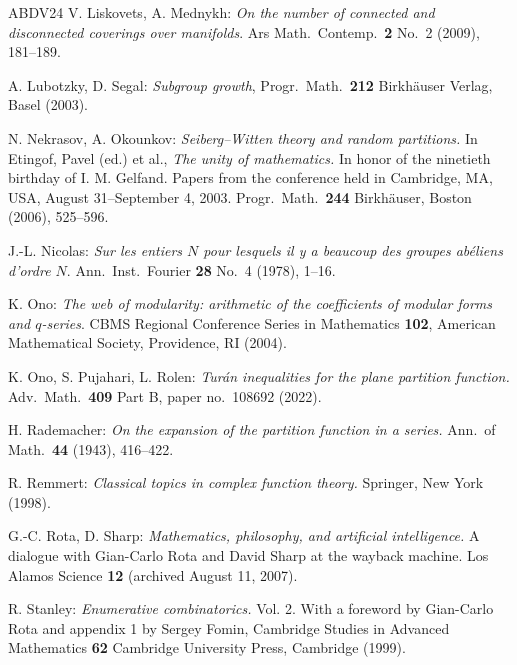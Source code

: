 \documentclass[11pt,reqno]{amsart}
\theoremstyle{plain}
\theoremstyle{remark}
\theoremstyle{definition}
\numberwithin{equation}{section}
\begin{document}
\begin{thebibliography}{ABDV24}
 V. Liskovets,
A. Mednykh:
\emph{On the number of connected and disconnected coverings over manifolds\/}.
Ars Math.\ Contemp.\ \textbf{2}
No.\ 2 (2009), 181--189.



 A. Lubotzky,
D. Segal: {\it Subgroup growth\/},
Progr.\ Math.\ \textbf{212}
Birkh\"{a}user Verlag, Basel
(2003). 






 N. Nekrasov, A. Okounkov: \emph{Seiberg--Witten theory and random partitions.}
In Etingof, Pavel (ed.) et al.,
{\it The unity of mathematics.\/}
In honor of the ninetieth birthday of I. M. Gelfand. Papers from the conference held in Cambridge, MA, USA, August 31--September 4, 2003.
Progr.\ Math.\ {\bf{244}} Birkh\"{a}user,
Boston (2006), 525--596.






  J.-L. Nicolas:
\emph{Sur les entiers \(N\) pour lesquels il y a
beaucoup des groupes ab\'{e}liens d'ordre \(N\)\/}.
Ann.\ Inst.\ Fourier \textbf{28}
No.\ 4 (1978), 1--16.


K. Ono:
\emph{The
web of
modularity:
arithmetic of the
coefficients of
modular
forms
and $q$-series\/}.
CBMS Regional Conference Series in Mathematics \textbf{102},
American Mathematical Society, Providence, RI (2004).

  K. Ono, S. Pujahari, L. Rolen:
\emph{Tur\'{a}n inequalities for the plane partition function.\/}
Adv.\ Math.\ \textbf{409} Part B,
paper no.\ 108692
(2022).

H. Rademacher: \emph{On the expansion of the partition function in a series.\/}
Ann.\ of Math.\ \textbf{44}
(1943), 416--422.


 R. Remmert: \emph{Classical topics in complex function theory.\/}
Springer, New York (1998).

 G.-C. Rota, D. Sharp: \emph{Mathematics,
philosophy, and
artificial
intelligence.\/} A dialogue with Gian-Carlo Rota and David Sharp at the
wayback
machine. Los Alamos Science
\textbf{12} (archived August 11, 2007).

 R. Stanley: \emph{Enumerative
combinatorics.\/} Vol. 2. With a foreword by
Gian-Carlo Rota and appendix 1 by Sergey Fomin, Cambridge Studies in Advanced
Mathematics
\textbf{62} Cambridge University Press, Cambridge (1999).


\end{thebibliography}
\end{document}
